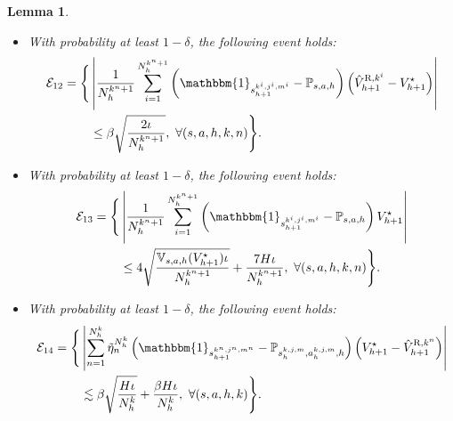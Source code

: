 \documentclass{article}
\newtheorem{lemma}{Lemma}[section]
\newcommand{\R}{\textnormal{R}}
\begin{document}
\begin{lemma}
\begin{itemize}
\begin{align*}
    \end{align*}
    \item[(l)] With probability at least $1-\delta$, the following event holds:
    \begin{align*}
        \mathcal{E}_{12} = \Bigg\{&\left|\frac{1}{N_h^{k^n+1}} \sum_{i=1}^{N_h^{k^n+1}}\left(\mathbbm{1}_{s_{h+1}^{k^i,j^i,m^i}}-\mathbb{P}_{s,a,h}\right)\left(\hat{V}_{h+1}^{\R,k^i}-V_{h+1}^{\star}\right)\right| \\
        &\leq \beta\sqrt{\frac{2\iota}{N_h^{k^n+1}}},\ \forall (s,a,h,k,n)\Bigg\}.
    \end{align*}    
    \item[(m)] With probability at least $1-\delta$, the following event holds:
    \begin{align*}
        \mathcal{E}_{13} = \Bigg\{&\left|\frac{1}{N_h^{k^n+1}} \sum_{i=1}^{N_h^{k^n+1}}\left(\mathbbm{1}_{s_{h+1}^{k^i,j^i,m^i}}-\mathbb{P}_{s,a,h}\right)V_{h+1}^{\star}\right| \\
        &\leq 4\sqrt{\frac{\mathbb{V}_{s,a,h}(V_{h+1}^{\star})\iota}{N_h^{k^n+1}}}+\frac{7H\iota}{N_h^{k^n+1}},\ \forall (s,a,h,k,n)\Bigg\}.
    \end{align*}   
    \item[(n)] With probability at least $1-\delta$, the following event holds:
    \begin{align*}
        \mathcal{E}_{14} = \Bigg\{&\left|\sum_{n=1}^{N_h^k} \Tilde{\eta}_n^{N_h^k}\left(\mathbbm{1}_{s_{h+1}^{k^n,j^n,m^n}}-\mathbb{P}_{s_h^{k,j,m}, a_h^{k,j,m},h}\right)\left(V_{h+1}^{\star}-\hat{V}_{h+1}^{\R,k^n}\right)\right| \\
        &\lesssim \beta \sqrt{\frac{H\iota}{N_h^k}} + \frac{\beta H\iota}{N_h^k},\ \forall (s,a,h,k)\Bigg\}.
    \end{align*}   
    \end{itemize}
\end{lemma}
\end{document}
